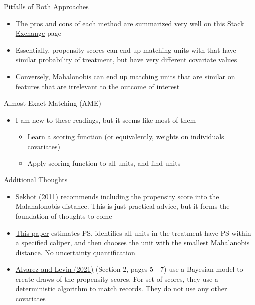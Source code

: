 \documentclass{beamer}
\begin{document}
\begin{frame}{Pitfalls of Both Approaches}
	\begin{itemize}
		\item The pros and cons of each method are summarized very well on this \href{https://stats.stackexchange.com/questions/511294/what-are-the-pros-and-cons-of-using-mahalanobis-distance-instead-of-propensity-s}{Stack Exchange} page
		\item Essentially, propensity scores can end up matching units with that have similar probability of treatment, but have very different covariate values
		\item Conversely, Mahalonobis can end up matching units that are similar on features that are irrelevant to the outcome of interest
	\end{itemize}
\end{frame}

\begin{frame}{Almost Exact Matching (AME)}
	\begin{itemize}
		\item I am new to these readings, but it seems like most of them
		\begin{itemize}
			\item Learn a scoring function (or equivalently, weights on individuals covariates)
			\item Apply scoring function to all units, and find units 
		\end{itemize}
	\end{itemize}
\end{frame}

\begin{frame}{Additional Thoughts}
	\begin{itemize}
		\item  \href{https://www.jstatsoft.org/article/view/v042i07}{Sekhot (2011)} recommends including the propensity score into the Malahalonobis distance. This is just practical advice, but it forms the foundation of thoughts to come
		\item \href{https://www.lexjansen.com/pharmasug/2006/PublicHealthResearch/PR05.pdf}{This paper} estimates PS, identifies all units in the treatment have PS within a specified caliper, and then chooses the unit with the smallest Mahalanobis distance. No uncertainty quantification
		\item \href{https://arxiv.org/pdf/2105.02362.pdf}{Alvarez and Levin (2021)} (Section 2, pages 5 - 7) use a Bayesian model to create draws of the propensity scores. For set of scores, they use a deterministic algorithm to match records. They do not use any other covariates
	\end{itemize}
\end{frame}
\end{document}
